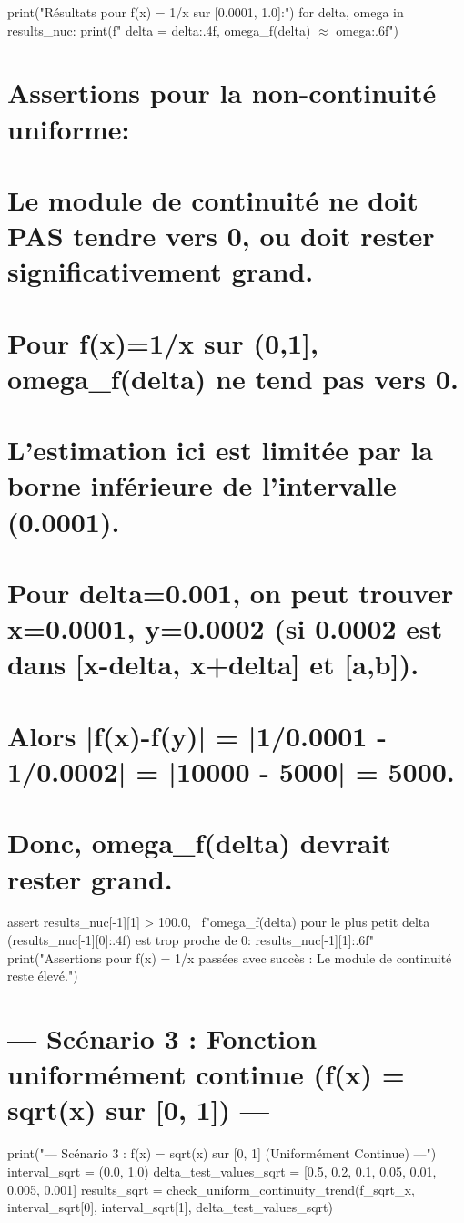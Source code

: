 \documentclass[12pt,a4paper]{report}
\begin{document}
print("Résultats pour f(x) = 1/x sur [0.0001, 1.0]:")
for delta, omega in results\_nuc:
    print(f"  delta = {delta:.4f}, omega\_f(delta) $\approx$ {omega:.6f}")

\section{Assertions pour la non-continuité uniforme:}
\section{Le module de continuité ne doit PAS tendre vers 0, ou doit rester significativement grand.}
\section{Pour f(x)=1/x sur (0,1], omega\_f(delta) ne tend pas vers 0.}
\section{L'estimation ici est limitée par la borne inférieure de l'intervalle (0.0001).}
\section{Pour delta=0.001, on peut trouver x=0.0001, y=0.0002 (si 0.0002 est dans [x-delta, x+delta] et [a,b]).}
\section{Alors |f(x)-f(y)| = |1/0.0001 - 1/0.0002| = |10000 - 5000| = 5000.}
\section{Donc, omega\_f(delta) devrait rester grand.}
assert results\_nuc[-1][1] > 100.0, \
    f"omega\_f(delta) pour le plus petit delta ({results\_nuc[-1][0]:.4f}) est trop proche de 0: {results\_nuc[-1][1]:.6f}"
print("Assertions pour f(x) = 1/x passées avec succès : Le module de continuité reste élevé.")

\section{--- Scénario 3 : Fonction uniformément continue (f(x) = sqrt(x) sur [0, 1]) ---}
print("--- Scénario 3 : f(x) = sqrt(x) sur [0, 1] (Uniformément Continue) ---")
interval\_sqrt = (0.0, 1.0)
delta\_test\_values\_sqrt = [0.5, 0.2, 0.1, 0.05, 0.01, 0.005, 0.001]
results\_sqrt = check\_uniform\_continuity\_trend(f\_sqrt\_x, interval\_sqrt[0], interval\_sqrt[1], delta\_test\_values\_sqrt)
\end{document}
